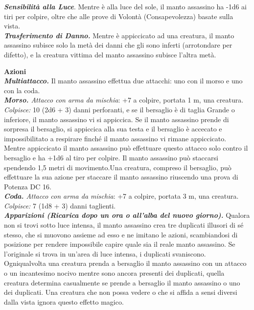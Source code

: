 \begin{multicols}{2}
\emph{\textbf{Sensibilità alla Luce}}. Mentre è alla luce del sole, il manto assassino ha -1d6 ai tiri per colpire, oltre che alle prove di Volontà (Consapevolezza) basate sulla vista.\\

\emph{\textbf{Trasferimento di Danno.}} Mentre è appiccicato ad una creatura, il manto assassino subisce solo la metà dei danni che gli sono inferti (arrotondare per difetto), e la creatura vittima del manto assassino subisce l'altra metà.

\smallskip\textbf{Azioni}\\

\emph{\textbf{Multiattacco.}} Il manto assassino effettua due attacchi: uno con il morso e uno con la coda.\\

\emph{\textbf{Morso.} Attacco con arma da mischia}: +7 a colpire, portata 1 m, una creatura.\\

\emph{Colpisce:} 10 (2d6 + 3) danni perforanti, e se il bersaglio è di taglia Grande o inferiore, il manto assassino vi si appiccica. Se il manto assassino prende di sorpresa il bersaglio, si appiccica alla sua testa e il bersaglio è accecato e impossibilitato a respirare finché il manto assassino vi rimane appiccicato.\\
Mentre appiccicato il manto assassino può effettuare questo attacco solo  contro il bersaglio e ha +1d6 al tiro per colpire. Il manto assassino può staccarsi spendendo 1,5 metri di movimento.Una creatura, compreso il bersaglio, può effettuare la sua azione per  staccare il  manto assassino riuscendo una prova di Potenza DC 16.\\

\emph{\textbf{Coda.} Attacco con arma da mischia}: +7 a colpire, portata 3 m, una creatura.\\
\emph{Colpisce:} 7 (1d8 + 3) danni taglienti.\\

\emph{\textbf{Apparizioni (Ricarica dopo un ora o all'alba del nuovo giorno).}} Qualora non si trovi sotto luce intensa, il manto assassino crea tre duplicati illusori di sé stesso, che si muovono assieme ad esso e ne imitano le azioni, scambiandosi di posizione per rendere impossibile capire quale sia il reale manto assassino. Se l'originale si trova in un'area di luce intensa, i duplicati svaniscono. \\
Ogniqualvolta una creatura prenda a bersaglio il manto assassino con un attacco o un incantesimo nocivo mentre sono ancora presenti dei duplicati, quella creatura determina casualmente se prende a bersaglio il manto assassino o uno dei duplicati. Una creatura che non possa vedere o che si affida a sensi diversi dalla vista ignora questo effetto magico.\\


\end{multicols}
